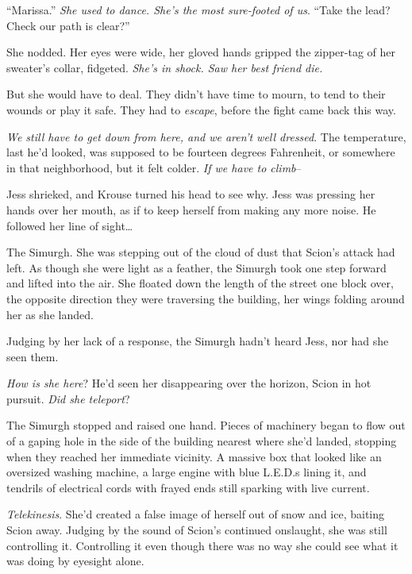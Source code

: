 ``Marissa.''  \emph{She used to dance.  She's the most sure-footed of us}.  ``Take the lead?  Check our path is clear?''



She nodded.  Her eyes were wide, her gloved hands gripped the zipper-tag of her sweater's collar, fidgeted.  \emph{She's in shock.  Saw her best friend die.}



But she would have to deal.  They didn't have time to mourn, to tend to their wounds or play it safe.  They had to \emph{escape}, before the fight came back this way.



\emph{We still have to get down from here, and we aren't well dressed}.  The temperature, last he'd looked, was supposed to be fourteen degrees Fahrenheit, or somewhere in that neighborhood, but it felt colder.  \emph{If we have to climb}–



Jess shrieked, and Krouse turned his head to see why.  Jess was pressing her hands over her mouth, as if to keep herself from making any more noise.  He followed her line of sight\ldots



The Simurgh.  She was stepping out of the cloud of dust that Scion's attack had left.  As though she were light as a feather, the Simurgh took one step forward and lifted into the air.  She floated down the length of the street one block over, the opposite direction they were traversing the building, her wings folding around her as she landed.



Judging by her lack of a response, the Simurgh hadn't heard Jess, nor had she seen them.



\emph{How is she here}?  He'd seen her disappearing over the horizon, Scion in hot pursuit.  \emph{Did she teleport}?



The Simurgh stopped and raised one hand.  Pieces of machinery began to flow out of a gaping hole in the side of the building nearest where she'd landed, stopping when they reached her immediate vicinity.  A massive box that looked like an oversized washing machine, a large engine with blue L.E.D.s lining it, and tendrils of electrical cords with frayed ends still sparking with live current.



\emph{Telekinesis}.  She'd created a false image of herself out of snow and ice, baiting Scion away.  Judging by the sound of Scion's continued onslaught, she was still controlling it.  Controlling it even though there was no way she could see what it was doing by eyesight alone.



